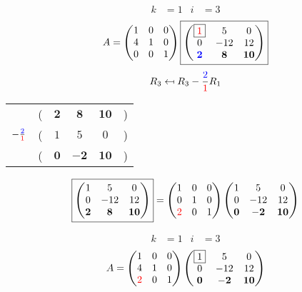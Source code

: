 \documentclass[pdf]{beamer}
\begin{document}
\begin{frame}{}\begin{align*} k &= 1 & i &= 3 \end{align*} $$A=\begin{pmatrix}1&0&0\\4&1&0\\0&0&1\end{pmatrix} \boxed{\begin{pmatrix}\boxed{{\color{red}1}}&5&0\\0&-12&12\\\mathbf{{\color{blue}2}}&\mathbf{8}&\mathbf{10}\end{pmatrix}} $$ $$R_3 \mapsfrom R_3 - \frac{{\color{blue}2}}{{\color{red}1}} R_1$$ \begin{center}\begin{tabular}{cccccc}  &(& $ \mathbf{2} $ & $ \mathbf{8} $ & $ \mathbf{10} $ &)\\$ -\frac{{\color{blue}2}}{{\color{red}1}} $&(& $ 1 $ & $ 5 $ & $ 0 $ &)\\\hline  &(& $ \mathbf{0} $ & $ \mathbf{-2} $ & $ \mathbf{10} $ &) \end{tabular}\end{center} $$ \boxed{\begin{pmatrix}1&5&0\\0&-12&12\\\mathbf{2}&\mathbf{8}&\mathbf{10}\end{pmatrix}} = \begin{pmatrix}1&0&0\\0&1&0\\{\color{red}2}&0&1\end{pmatrix} \begin{pmatrix}1&5&0\\0&-12&12\\\mathbf{0}&\mathbf{-2}&\mathbf{10}\end{pmatrix} $$\end{frame}
\begin{frame}{}\begin{align*} k &= 1 & i &= 3 \end{align*}$$A=\begin{pmatrix}1&0&0\\4&1&0\\{\color{red}2}&0&1\end{pmatrix} \begin{pmatrix}\boxed{1}&5&0\\0&-12&12\\\mathbf{0}&\mathbf{-2}&\mathbf{10}\end{pmatrix} $$\end{frame}
\end{document}
